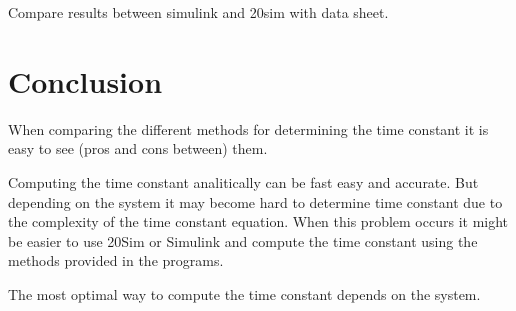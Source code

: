 \documentclass[12pt,a4paper]{article}
\begin{document}
Compare results between simulink and 20sim with data sheet.
\lipsum[4]

\section{Conclusion}
When comparing the different methods for determining the time constant it is easy to see (pros and cons between) them.

Computing the time constant analitically can be fast easy and accurate. But depending on the system it may become hard to determine time constant due to the complexity of the time constant equation. When this problem occurs it might be easier to use 20Sim or Simulink and compute the time constant using the methods provided in the programs.

The most optimal way to compute the time constant depends on the system.

\begin{thebibliography}{99}

\end{thebibliography}
\end{document}

